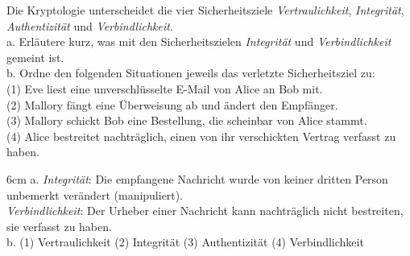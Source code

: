 \question[5]
Die Kryptologie unterscheidet die vier Sicherheitsziele \textit{Vertraulichkeit}, \textit{Integrit\"at},
\textit{Authentizit\"at} und \textit{Verbindlichkeit}. \\
a. Erl\"autere kurz, was mit den Sicherheitszielen \textit{Integrit\"at} und \textit{Verbindlichkeit} gemeint ist. \\
b. Ordne den folgenden Situationen jeweils das verletzte Sicherheitsziel zu: \\
\hspace*{1em} (1) Eve liest eine unverschl\"usselte E-Mail von Alice an Bob mit. \\
\hspace*{1em} (2) Mallory f\"angt eine \"Uberweisung ab und \"andert den Empf\"anger. \\
\hspace*{1em} (3) Mallory schickt Bob eine Bestellung, die scheinbar von Alice stammt. \\
\hspace*{1em} (4) Alice bestreitet nachtr\"aglich, einen von ihr verschickten Vertrag verfasst zu haben.

\begin{solutionbox}{6cm}
a. \textit{Integrit\"at}: Die empfangene Nachricht wurde von keiner dritten Person unbemerkt ver\"andert
(manipuliert). \\
\textit{Verbindlichkeit}: Der Urheber einer Nachricht kann nachtr\"aglich nicht bestreiten, sie verfasst
zu haben. \\
b. (1) Vertraulichkeit \quad (2) Integrit\"at \quad (3) Authentizit\"at \quad (4) Verbindlichkeit
\end{solutionbox}
